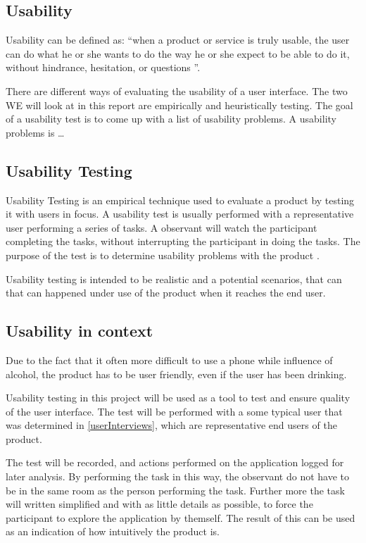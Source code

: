 \subsection{Usability}
\label{sub:usability}

Usability can be defined as: \enquote{when a product or service is truly usable, the user can do what he or she wants to do the way he or she expect to be able to do it, without hindrance, hesitation, or questions \cite{RubinChisnellSpool08}}.

There are different ways of evaluating the usability of a user interface. The two WE will look at in this report are empirically and heuristically testing. The goal of a usability test is to come up with a list of usability problems. A usability problems is \dots {}

\subsection{Usability Testing}
Usability Testing is an empirical technique used to evaluate a product by testing it with users in focus. A usability test is usually performed with a representative user performing a series of tasks. A observant will watch the participant completing the tasks, without interrupting the participant in doing the tasks. The purpose of the test is to determine usability problems with the product \cite{RubinChisnellSpool08}.


Usability testing is intended to be realistic and a potential scenarios, that can that can happened under use of the product when it reaches the end user.

\subsection{Usability in context}
\label{sub:usability_in_context}

Due to the fact that it often more difficult to use a phone while influence of alcohol, the product has to be user friendly, even if the user has been drinking.

Usability testing in this project will be used as a tool to test and ensure quality of the user interface. The test will be performed with a some typical user that was determined in \cref{userInterviews}, which are representative end users of the product.

The test will be recorded, and actions performed on the application logged for later analysis. By performing the task in this way, the observant do not have to be in the same room as the person performing the task. Further more the task will written simplified and with as little details as possible, to force the participant to explore the application by themself. The result of this can be used as an indication of how intuitively the product is.

